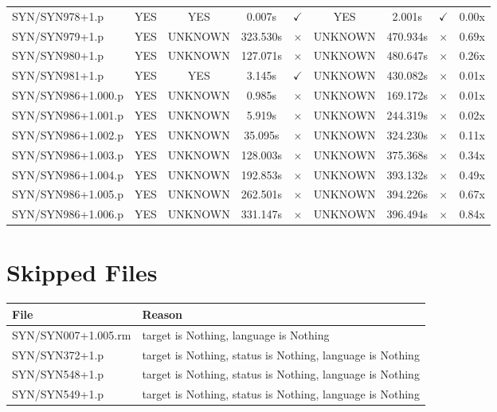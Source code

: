 \documentclass[a4paper,10pt]{article}
\begin{document}
\begin{longtable}{lcccccccc}
SYN/SYN978+1.p & YES & YES & 0.007s & \cellcolor{matchcolor}$\checkmark$ & YES & 2.001s & \cellcolor{matchcolor}$\checkmark$ & 0.00x \\
SYN/SYN979+1.p & YES & UNKNOWN & 323.530s & \cellcolor{mismatchcolor}$\times$ & UNKNOWN & 470.934s & \cellcolor{mismatchcolor}$\times$ & 0.69x \\
SYN/SYN980+1.p & YES & UNKNOWN & 127.071s & \cellcolor{mismatchcolor}$\times$ & UNKNOWN & 480.647s & \cellcolor{mismatchcolor}$\times$ & 0.26x \\
SYN/SYN981+1.p & YES & YES & 3.145s & \cellcolor{matchcolor}$\checkmark$ & UNKNOWN & 430.082s & \cellcolor{mismatchcolor}$\times$ & 0.01x \\
SYN/SYN986+1.000.p & YES & UNKNOWN & 0.985s & \cellcolor{mismatchcolor}$\times$ & UNKNOWN & 169.172s & \cellcolor{mismatchcolor}$\times$ & 0.01x \\
SYN/SYN986+1.001.p & YES & UNKNOWN & 5.919s & \cellcolor{mismatchcolor}$\times$ & UNKNOWN & 244.319s & \cellcolor{mismatchcolor}$\times$ & 0.02x \\
SYN/SYN986+1.002.p & YES & UNKNOWN & 35.095s & \cellcolor{mismatchcolor}$\times$ & UNKNOWN & 324.230s & \cellcolor{mismatchcolor}$\times$ & 0.11x \\
SYN/SYN986+1.003.p & YES & UNKNOWN & 128.003s & \cellcolor{mismatchcolor}$\times$ & UNKNOWN & 375.368s & \cellcolor{mismatchcolor}$\times$ & 0.34x \\
SYN/SYN986+1.004.p & YES & UNKNOWN & 192.853s & \cellcolor{mismatchcolor}$\times$ & UNKNOWN & 393.132s & \cellcolor{mismatchcolor}$\times$ & 0.49x \\
SYN/SYN986+1.005.p & YES & UNKNOWN & 262.501s & \cellcolor{mismatchcolor}$\times$ & UNKNOWN & 394.226s & \cellcolor{mismatchcolor}$\times$ & 0.67x \\
SYN/SYN986+1.006.p & YES & UNKNOWN & 331.147s & \cellcolor{mismatchcolor}$\times$ & UNKNOWN & 396.494s & \cellcolor{mismatchcolor}$\times$ & 0.84x \\
\bottomrule
\end{longtable}


\section{Skipped Files}

\begin{longtable}{ll}
\toprule
\textbf{File} & \textbf{Reason} \\
\midrule
\endhead
SYN/SYN007+1.005.rm & target is Nothing, language is Nothing \\
SYN/SYN372+1.p & target is Nothing, status is Nothing, language is Nothing \\
SYN/SYN548+1.p & target is Nothing, status is Nothing, language is Nothing \\
SYN/SYN549+1.p & target is Nothing, status is Nothing, language is Nothing \\
\bottomrule
\end{longtable}
\end{document}
